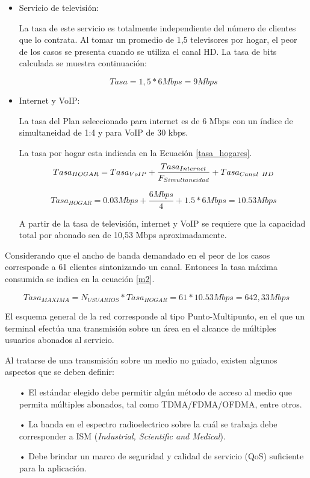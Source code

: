 \begin{itemize}
\item Servicio de televisión:

La tasa de este servicio es totalmente independiente del número de clientes que lo contrata. Al tomar un promedio de 1,5 televisores por hogar, el peor de los casos se presenta cuando se utiliza el canal HD. La tasa de bits calculada se muestra continuación:

\begin{equation}
Tasa=1,5 * 6Mbps= 9Mbps
\end{equation}

\item Internet y VoIP:

La tasa del Plan seleccionado para internet es de 6 Mbps con un índice de simultaneidad de 1:4 y para VoIP de 30 kbps.

La tasa por hogar esta indicada en la Ecuación \ref{tasa_hogares}.
\begin{equation}
Tasa_{HOGAR}=Tasa_{VoIP}+\dfrac{Tasa_{Internet}}{F_{Simultaneidad}} +Tasa_{Canal\hspace{0.15cm}HD}
\label{tasa_hogares}
\end{equation}

\begin{equation}
Tasa_{HOGAR}=0.03 Mbps + \dfrac{6Mbps}{4}+ 1.5*6 Mbps=10.53Mbps
\label{m3}
\end{equation}

A partir de la tasa de televisión, internet y VoIP se requiere que la capacidad total por abonado sea de 10,53 Mbps aproximadamente.
\end{itemize}


Considerando que el ancho de banda demandado en el peor de los casos corresponde a 61 clientes sintonizando un canal. Entonces la tasa máxima consumida se indica en la ecuación \ref{m2}.

\begin{equation}
Tasa_{MAXIMA}=N_{USUARIOS}*Tasa_{HOGAR}=61*10.53Mbps=642,33 Mbps
\label{m2}
\end{equation}

El esquema general de la red corresponde al tipo Punto-Multipunto, en el que un terminal efectúa una transmisión sobre un área en el alcance de múltiples usuarios abonados al servicio.

Al tratarse de una transmisión sobre un medio no guiado, existen algunos aspectos que se deben definir:
\begin{enumerate}
\item[•]El estándar elegido debe permitir algún método de acceso al medio que permita múltiples abonados, tal como TDMA/FDMA/OFDMA, entre otros.
\item[•]La banda en el espectro radioelectrico sobre la cuál se trabaja debe corresponder a ISM (\textit{Industrial, Scientific and Medical}).
\item[•]Debe brindar un marco de seguridad y calidad de servicio (QoS) suficiente para la aplicación. 
\end{enumerate}


